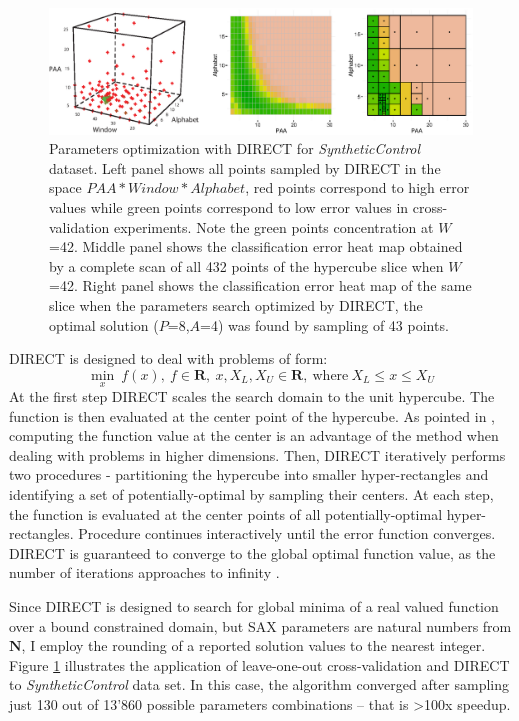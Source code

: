 \begin{figure}[t]
   \centering
   \includegraphics[width=150mm]{figures/figure_direct.eps}
   \caption{Parameters optimization with DIRECT for \textit{SyntheticControl} dataset. 
   Left panel shows all points sampled by DIRECT in the space \mbox{$PAA*Window*Alphabet$},
   red points correspond to high error values while green points correspond to low error values 
   in cross-validation experiments. 
   Note the green points concentration at $W$=42. 
   Middle panel shows the classification error heat map obtained by a complete scan 
   of all 432 points of the hypercube slice when $W$=42. 
   Right panel shows the classification error heat map of the same slice when 
   the parameters search optimized by DIRECT, 
   the optimal solution ($P$=8,$A$=4) was found by sampling of 43 points.}
   \label{fig:direct-sampling}
\end{figure}

DIRECT is designed to deal with problems of form:
\begin{equation}
 \min_{x} \: f(x), \: f \in \mathbf{R}, \: x, X_{L}, X_{U} \in \mathbf{R}, \: \text{where} \: X_{L} \leq x \leq X_{U}
 \label{formula:direct}
\end{equation} 
At the first step DIRECT scales the search domain to the unit hypercube. The function is then evaluated 
at the center point of the hypercube. As pointed in \cite{citeulike:12563460}, computing the function value
at the center is an advantage of the method when dealing with problems
in higher dimensions.
Then, DIRECT iteratively performs two procedures - partitioning the hypercube into smaller hyper-rectangles 
and identifying a set of potentially-optimal by sampling their centers. At each step, the function is evaluated 
at the center points of all potentially-optimal hyper-rectangles. Procedure continues interactively until the 
error function converges. DIRECT is guaranteed to converge to the global optimal function value,
as the number of iterations approaches to infinity \cite{citeulike:12563460}.

Since DIRECT is designed to search for global minima of a real valued function over a bound constrained domain, 
but SAX parameters are natural numbers from $\mathbf{N}$, I employ the rounding of a reported solution values to 
the nearest integer.
Figure \ref{fig:direct-sampling} illustrates the application of leave-one-out cross-validation and DIRECT to 
\textit{SyntheticControl} data set. In this case, the algorithm converged after sampling just 130 out of 13'860 
possible parameters combinations -- that is \textgreater100x speedup.

